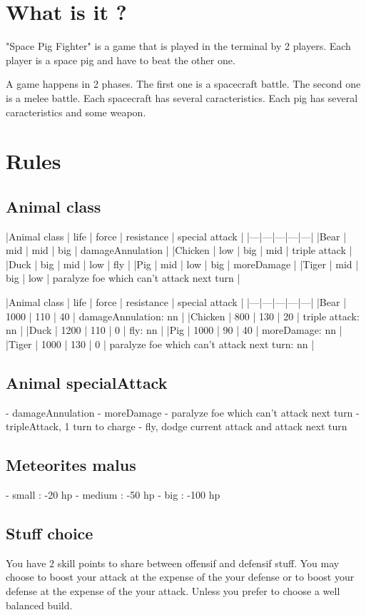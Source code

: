 \section{What is it ?}
"Space Pig Fighter" is a game that is played in the terminal by 2 players. Each player is a space pig and have to beat the other one. 

A game happens in 2 phases. The first one is a spacecraft battle. The second one is a melee battle.
Each spacecraft has several caracteristics. 
Each pig has several caracteristics and some weapon. 


\section{Rules}

\subsection{Animal class}

|Animal class | life | force | resistance | special attack |
|---|---|---|---|---|
|Bear | mid | mid | big | damageAnnulation |
|Chicken | low | big | mid | triple attack |
|Duck | big | mid | low | fly |
|Pig | mid | low | big | moreDamage |
|Tiger | mid | big | low | paralyze foe which can't attack next turn |

|Animal class | life | force | resistance | special attack |
|---|---|---|---|---|
|Bear | 1000 | 110 | 40 | damageAnnulation: nn |
|Chicken | 800 | 130 | 20 | triple attack: nn |
|Duck | 1200 | 110 | 0 | fly: nn |
|Pig | 1000 | 90 | 40 | moreDamage: nn |
|Tiger | 1000 | 130 | 0 | paralyze foe which can't attack next turn: nn |


\subsection{Animal specialAttack}

- damageAnnulation
- moreDamage
- paralyze foe which can't attack next turn
- tripleAttack, 1 turn to charge
- fly, dodge current attack and attack next turn


\subsection{Meteorites malus}
- small : -20 hp
- medium : -50 hp
- big : -100 hp


\subsection{Stuff choice}
You have 2 skill points to share between offensif and defensif stuff. You may choose to boost your attack at the expense of the your defense or to boost your defense at the expense of the your attack. Unless you prefer to choose a well balanced build.

